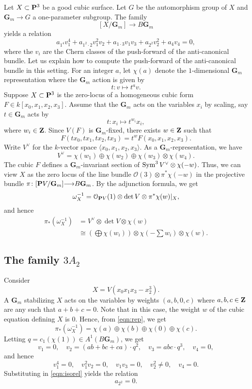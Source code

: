 \documentclass[11pt,reqno, letterpaper]{amsart}
\renewcommand{\to}{{\longrightarrow}}
\numberwithin{equation}{section}
\renewcommand{\O}{\mathcal O}
\newcommand{\G}{\mathbf G}
\begin{document}
Let $X \subset \P^3$ be a good cubic surface.
Let $G$ be the automorphism group of $X$ and $\G_m \to G$ a one-parameter subgroup.
The family
\[ [X/\G_m] \to B\G_m\]
yields a relation
\begin{equation}\label{eqn:isorel}
  a_{1^4}v_1^4 + a_{1^2\cdot 2} v_1^2v_2 + a_{1\cdot 3} v_1v_3 + a_{2^2}v_2^2 + a_4 v_4 = 0,
\end{equation}
where the $v_i$ are the Chern classes of the push-forward of the anti-canonical bundle.
Let us explain how to compute the push-forward of the anti-canonical bundle in this setting.
For an integer $a$, let $\chi(a)$ denote the $1$-dimensional $\G_m$ representation where the $\G_m$ action is given by
\[ t \colon v \mapsto t^a v.\]
Suppose $X \subset \P^3$ is the zero-locus of a homogeneous cubic form $F \in k[x_0,x_1,x_2,x_3]$.
Assume that the $\G_m$ acts on the variables $x_i$ by scaling, say $t \in \G_m$ acts by
\[ t \colon x_i \mapsto t^{w_i}x_i,\]
where $w_i \in \Z$.
Since $V(F)$ is $\G_m$-fixed, there exists $w \in \Z$ such that
\[ F \left(t x_0, t x_1, t x_2, t x_3\right) = t^w F\left(x_0, x_1, x_2,x_3\right).\]
Write $V^\vee$ for the $k$-vector space $\langle x_0, x_1, x_2,x_3 \rangle$.
As a $\G_m$-representation, we have
\[ V^\vee = \chi(w_1) \oplus \chi(w_2) \oplus \chi(w_3) \otimes \chi(w_4).\]
The cubic $F$ defines a $\G_m$-invariant section of $\Sym^3 V^\vee \otimes \chi(-w)$.
Thus, we can view $X$ as the zero locus of the line bundle $\O(3) \otimes \pi^*\chi(-w)$ in the projective bundle $\pi \colon [\P V/\G_m] \to B\G_m$.
By the adjunction formula, we get
\[ \omega_X^{-1} = \O_{\P V}(1) \otimes \det V \otimes \pi^*\chi(w) |_X,\]
and hence
\begin{equation}\label{eqn:rep}
\begin{split}
  \pi_*\left( \omega_X^{-1} \right) &= V^\vee \otimes \det V \otimes \chi(w) \\
  &\cong \left( \bigoplus \chi(w_i)  \right) \otimes \chi\left(-\sum w_i\right) \otimes \chi(w).
\end{split}
\end{equation}

\subsection{The family $3A_2$}
Consider
\[ X = V(x_0x_1x_3 - x_2^3).\]
A $\G_m$ stabilizing $X$ acts on the variables by weights $(a,b,0,c)$ where $a,b,c \in \Z$ are any such that $a+b+c = 0$.
Note that in this case, the weight $w$ of the cubic equation defining $X$ is $0$.
Hence, from \eqref{eqn:rep}, we get
\[ \pi_*\left(\omega^{-1}_X\right) = \chi(a) \oplus \chi(b) \oplus \chi(0) \oplus \chi(c).\]
Letting $q = c_1(\chi(1)) \in A^1(B\G_m)$, we get
\[ v_1 = 0, \quad v_2 = (ab+bc+ca) \cdot q^2, \quad v_3 = abc \cdot q^3, \quad v_4 = 0,\]
and hence
\[ v_1^4 = 0, \quad v_1^2v_2 = 0, \quad v_1v_3 = 0,\quad v_2^2 \neq 0, \quad v_4 = 0.\]
Substituting in \eqref{eqn:isorel} yields the relation
\begin{equation}\label{eqn:iso1}
  a_{2^2} = 0.
\end{equation}
\end{document}
